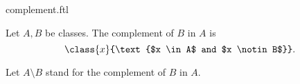 \documentclass{stex}
\begin{document}
\begin{smodule}{complement.ftl}

  \begin{forthel}
    \begin{definition}
      Let $A, B$ be classes.
      The complement of $B$ in $A$ is
      \[\class{x}{\text{$x \in A$ and $x \notin B$}}.\]
    \end{definition}

    Let $A \setminus B$ stand for the complement of $B$ in $A$.
  \end{forthel}
\end{smodule}
\end{document}

